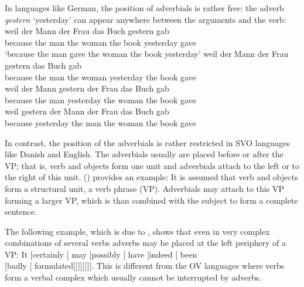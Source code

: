 In languages like German, the position of adverbials is rather free: the adverb \emph{gestern}
`yesterday' can appear anywhere between the arguments and the verb:
\eal
\ex
\gll weil der Mann der Frau das Buch {gestern} gab\\ 
     because the man the woman the book yesterday gave\\
\glt `because the man gave the woman the book yesterday'
\ex 
\gll weil der Mann der Frau {gestern} das Buch gab\\
     because the man the woman yesterday the book gave\\
\ex 
\gll weil der Mann {gestern} der Frau das Buch gab\\
     because the man yesterday the woman the book gave\\
\ex 
\gll weil {gestern} der Mann der Frau das Buch gab\\
     because yesterday the man the woman the book gave\\
\zl

In contrast, the position of the adverbials is rather restricted in SVO languages like Danish and
English. The adverbials usually are placed before or after the VP; that is, verb and objects form one
unit and adverbials attach to the left or to the right of this unit. () provides an example:
\eal
{}
\zl
It is assumed that verb and objects form a structural unit, a verb phrase (VP). Adverbials may
attach to this VP forming a larger VP, which is than combined with the subject to form a complete sentence.

The following example, which is due to \citet[§ 8.20, 495]{QGLS85a-u}, shows that even in very
complex combinations of several verbs adverbs may be placed at the left periphery of a VP:
\ea
It [certainly [ may [possibly [ have [indeed [ been\\ {}[badly [ formulated]]]]]]]].
\z
This is different from the OV languages where verbs form a verbal complex which usually cannot be
interrupted by adverbs.
\eal
{}
\zl

